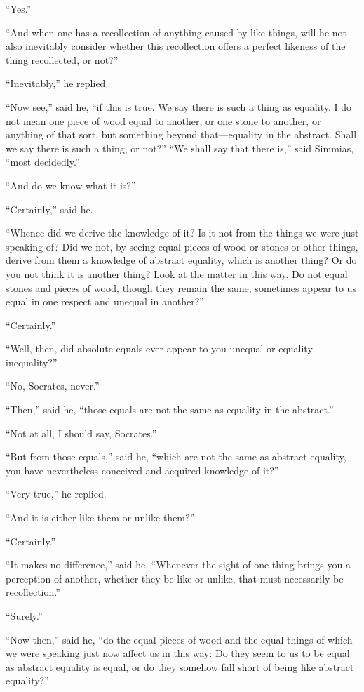\documentclass[letterpaper,12pt]{article}
\newcommand{\stephpag}[1]{\marginnote{\small\itshape\fontfamily{ppl}\selectfont #1}}
\begin{document}
\begin{drama}
``Yes.''
 
``And when one has a recollection of anything caused by like things, will he not also inevitably consider whether this recollection offers a perfect likeness of the thing recollected, or not?''
 
``Inevitably,'' he replied.
 
``Now see,'' said he, ``if this is true. We say there is such a thing as equality. I do not mean one piece of wood equal to another, or one stone to another, or anything of that sort, but something beyond that---equality in the abstract. Shall we say there is such a thing, or not?'' \stephpag{b} ``We shall say that there is,'' said Simmias, ``most decidedly.''
 
``And do we know what it is?''
 
``Certainly,'' said he.
 
``Whence did we derive the knowledge of it? Is it not from the things we were just speaking of? Did we not, by seeing equal pieces of wood or stones or other things, derive from them a knowledge of abstract equality, which is another thing? Or do you not think it is another thing? Look at the matter in this way. Do not equal stones and pieces of wood, though they remain the same, sometimes appear to us equal in one respect and unequal in another?''
 
``Certainly.''
 
``Well, then, did absolute equals ever appear to you unequal or \stephpag{c} equality inequality?''
 
``No, Socrates, never.''
 
``Then,'' said he, ``those equals are not the same as equality in the abstract.''
 
``Not at all, I should say, Socrates.''
 
``But from those equals,'' said he, ``which are not the same as abstract equality, you have nevertheless conceived and acquired knowledge of it?''
 
``Very true,'' he replied.
 
``And it is either like them or unlike them?''
 
``Certainly.''
 
``It makes no difference,'' said he. ``Whenever the sight of one thing \stephpag{d} brings you a perception of another, whether they be like or unlike, that must necessarily be recollection.''
 
``Surely.''
 
``Now then,'' said he, ``do the equal pieces of wood and the equal things of which we were speaking just now affect us in this way: Do they seem to us to be equal as abstract equality is equal, or do they somehow fall short of being like abstract equality?''
 

\end{drama}
\end{document}

